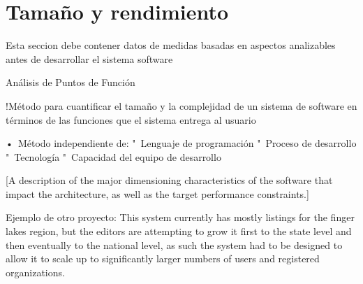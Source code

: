 \chapter{Tamaño y rendimiento}

Esta seccion debe contener datos de medidas basadas en aspectos analizables antes de desarrollar el sistema software

Análisis de Puntos de Función

    !Método para cuantificar el tamaño y la complejidad de un sistema de software en términos de las funciones que el sistema entrega al usuario 
    
    •  Método independiente de: 
        "  Lenguaje de programación 
        "  Proceso de desarrollo 
        "  Tecnología 
        "  Capacidad del equipo de desarrollo


[A description of the major dimensioning characteristics of the software that impact the architecture, as well as the target performance constraints.]

Ejemplo de otro proyecto:
    This system currently has mostly listings for the finger lakes region, but the editors are attempting to grow it first to the state level and then eventually to the national level, as such the system had to be designed to allow it to scale up to significantly larger numbers of users and registered organizations.

